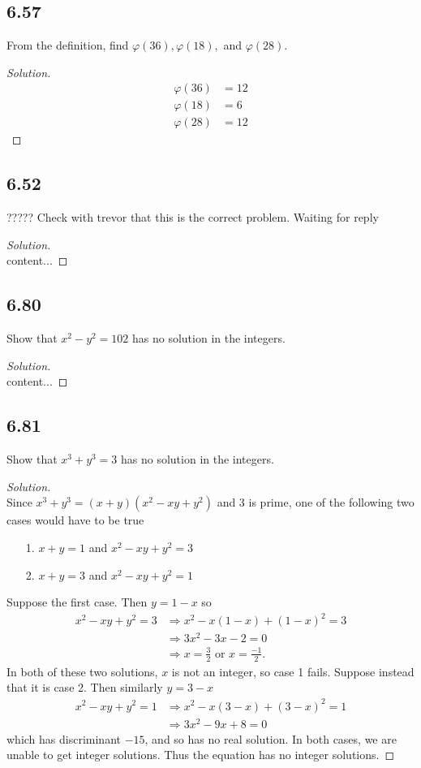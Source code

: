 \documentclass[]{article}
\let\phi\varphi
\newcommand\<{\langle}
\renewcommand\>{\rangle}
\newenvironment{solution}
{
	\begin{proof}[Solution] \text{ }
		\\
	}
	{
	\end{proof}
}
\begin{document}
\subsection*{6.57} From the definition, find $\phi(36), \phi(18),$ and $\phi(28)$.
\begin{solution}
	\begin{align*}
		\phi(36) &= 12 \\
		\phi(18) &= 6 \\
		\phi(28) &= 12
	\end{align*}
\end{solution}

\subsection*{6.52} ????? Check with trevor that this is the correct problem. Waiting for reply
\begin{solution}
	content...
\end{solution}

\subsection*{6.80} Show that $x^2 - y^2 = 102$ has no solution in the integers.
\begin{solution}
	content...
\end{solution}

\subsection*{6.81} Show that $x^3 + y^3 = 3$ has no solution in the integers.
\begin{solution}
	Since $x^3 + y^3 = (x + y)(x^2 - xy + y^2)$ and 3 is prime, one of the following two cases would have to be true
	\begin{enumerate}
		\item[1.] $x + y = 1$ and $x^2 - xy + y^2 = 3$
		\item[2.] $x + y = 3$ and $x^2 - xy + y^2 = 1$
	\end{enumerate}
	Suppose the first case. Then $y = 1 - x$ so
	\begin{align*}
		x^2 - xy + y^2 = 3 &\Rightarrow x^2 - x(1 - x) + (1 - x)^2 = 3 \\
		&\Rightarrow 3x^2 - 3x - 2 = 0 \\
		&\Rightarrow x = \frac{3}{2} \text{ or } x = \frac{-1}{2}.
	\end{align*}
	In both of these two solutions, $x$ is not an integer, so case 1 fails. Suppose instead that it is case 2. Then similarly $y = 3 - x$
	\begin{align*}
		x^2 - xy + y^2 = 1 &\Rightarrow x^2 - x(3 - x) + (3 - x)^2 = 1 \\
		&\Rightarrow 3x^2 - 9x + 8 = 0
	\end{align*}
	which has discriminant $-15$, and so has no real solution. In both cases, we are unable to get integer solutions. Thus the equation has no integer solutions.
	
\end{solution}
\end{document}

